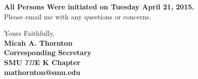 \documentclass{letter}
\begin{document}
\begin{center}
\textbf{All Persons Were initiated on Tuesday April 21, 2015.} \\Please email me with any questions or concerns. 
\end{center}


        \begin{flushright}
        \closing{Yours Faithfully, \vspace{1 em}\\\textbf{\hspace{3 em}Micah A. Thornton\\\vspace{3 em}\hspace{3 em}Corresponding Secretary\\\hspace{3 em}SMU $\Upsilon\Pi$E K Chapter\\\hspace{3 em}mathornton@smu.edu}}
        \end{flushright}
\end{document}
